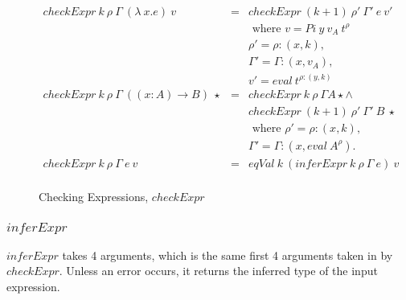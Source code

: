 \documentclass[acmsmall]{acmart}
\begin{document}
\begin{figure}[H]
  \begin{equation*}
    \begin{aligned}
      checkExpr \: k \: \rho \: \Gamma \: (\lambda \: x.e) \: v  & = & checkExpr \: (k + 1) \: \rho' \: \Gamma' \:e \: v'          \\
                                                                 &   & \textrm{ where } v = Pi \: y \: v_A \: t^{\rho}             \\ 
                                                                 &   & \rho' = \rho : (x, k),                                      \\
                                                                 &   & \Gamma' = \Gamma : (x, v_A),                                \\
                                                                 &   & v' = eval \: t^{\rho:(y, k)}                                \\
      checkExpr \: k \: \rho \: \Gamma \: ((x:A) \to B) \: \star & = & checkExpr \: k \: \rho \: \Gamma A \star              \land \\
                                                                 &   & checkExpr \: (k+1) \: \rho' \: \Gamma' \: B \: \star        \\
                                                                 &   & \textrm{ where } \rho' = \rho : (x, k),                     \\
                                                                 &   & \Gamma' = \Gamma:(x, eval \: A^{\rho}).                     \\
      checkExpr \: k \: \rho \: \Gamma \: e \: v                 & = & eqVal \: k \: (inferExpr \: k \: \rho \: \Gamma \: e) \: v  \\
    \end{aligned}
  \end{equation*}
  \caption{Checking Expressions, $checkExpr$}
\end{figure}


\subsubsection{$inferExpr$}

$inferExpr$ takes 4 arguments, which is the same first 4 arguments taken in by $checkExpr$. Unless an error occurs, it returns the inferred type of the input expression.
\end{document}
